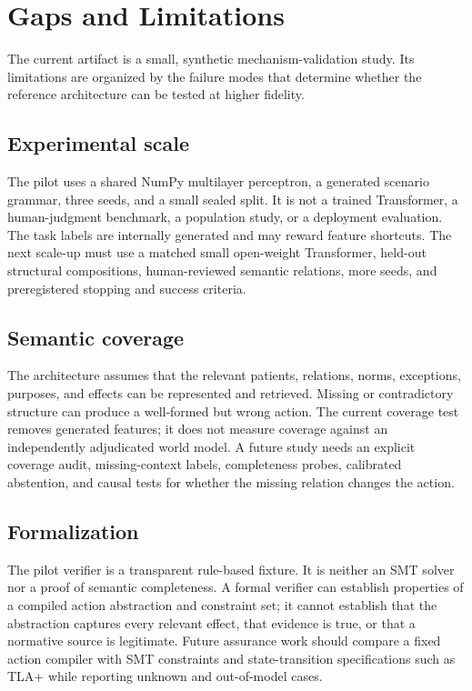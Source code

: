 \section{Gaps and Limitations}
\label{sec:limitations}

The current artifact is a small, synthetic mechanism-validation study. Its limitations are organized by the failure modes that determine whether the reference architecture can be tested at higher fidelity.

\subsection{Experimental scale}

The pilot uses a shared NumPy multilayer perceptron, a generated scenario grammar, three seeds, and a small sealed split. It is not a trained Transformer, a human-judgment benchmark, a population study, or a deployment evaluation. The task labels are internally generated and may reward feature shortcuts. The next scale-up must use a matched small open-weight Transformer, held-out structural compositions, human-reviewed semantic relations, more seeds, and preregistered stopping and success criteria.

\subsection{Semantic coverage}

The architecture assumes that the relevant patients, relations, norms, exceptions, purposes, and effects can be represented and retrieved. Missing or contradictory structure can produce a well-formed but wrong action. The current coverage test removes generated features; it does not measure coverage against an independently adjudicated world model. A future study needs an explicit coverage audit, missing-context labels, completeness probes, calibrated abstention, and causal tests for whether the missing relation changes the action.

\subsection{Formalization}

The pilot verifier is a transparent rule-based fixture. It is neither an SMT solver nor a proof of semantic completeness. A formal verifier can establish properties of a compiled action abstraction and constraint set; it cannot establish that the abstraction captures every relevant effect, that evidence is true, or that a normative source is legitimate. Future assurance work should compare a fixed action compiler with SMT constraints and state-transition specifications such as TLA+ while reporting unknown and out-of-model cases.

